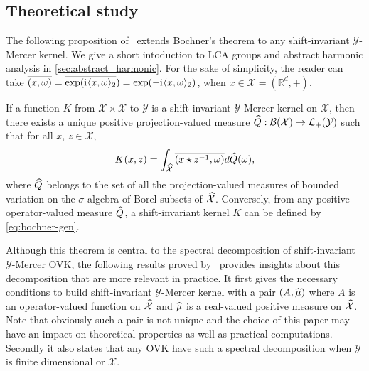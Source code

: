 \documentclass[twoside,11pt]{article}
\begin{document}
\subsection{Theoretical study}
\label{sec:theoretical_study}
The following proposition of~\citet{Zhang2012, neeb1998operator} extends
Bochner's theorem to any shift-invariant $\mathcal{Y}$-Mercer kernel. We give a
short intoduction to \acs{LCA} groups and abstract harmonic analysis in
\cref{sec:abstract_harmonic}. For the sake of simplicity, the reader can take
$\overline{(x,\omega)}=\overline{\exp({\mathrm{i}\mkern1mu}\langle x,
\omega\rangle_2})=\exp(-{\mathrm{i}\mkern1mu}\langle x,\omega\rangle_2)$, when $x\in\mathcal{X}=(\mathbb{R}^d,
+)$.
\begin{proposition}
    \label{pr:operator_valued_bochner}
    If a function $K$ from $\mathcal{X} \times \mathcal{X}$ to $\mathcal{Y}$ is
    a shift-invariant $\mathcal{Y}$-Mercer kernel on $\mathcal{X}$, then there
    exists a unique positive projection-valued measure $\widehat{Q}:
    \mathcal{B}(\mathcal{X}) \to
    \mathcal{L}_+(\mathcal{Y})$ such that for all $x$, $z \in \mathcal{X}$,
    \begin{dmath}
        \label{eq:bochner-gen}
        K(x, z) = \int_{\dual{\mathcal{X}}} \conj{\pairing{x \groupop \inv{z},
        \omega}} d\dual{Q}(\omega),
    \end{dmath}
    where $\widehat{Q}$ belongs to the set of all the projection-valued measures
    of bounded variation on the $\sigma$-algebra of Borel subsets of
    $\widehat{\mathcal{X}}$. Conversely, from any positive operator-valued measure
    $\widehat{Q}$, a shift-invariant kernel $K$ can be defined by
    \cref{eq:bochner-gen}.
\end{proposition}
Although this theorem is central to the spectral decomposition of
shift-invariant $\mathcal{Y}$-Mercer \acs{OVK}, the following results proved
by~\citet{Carmeli2010} provides insights about this decomposition that are more
relevant in practice. It first gives the necessary conditions to build
shift-invariant $\mathcal{Y}$-Mercer kernel with a pair $(A, \widehat{\mu})$ where
$A$ is an operator-valued function on $\widehat{\mathcal{X}}$ and $\widehat{\mu}$ is
a real-valued positive measure on $\widehat{\mathcal{X}}$. Note that obviously
such a pair is not unique and the choice of this paper may have an impact on
theoretical properties as well as practical computations.  Secondly it also
states that any \acs{OVK} have such a spectral decomposition when $\mathcal{Y}$
is finite dimensional or $\mathcal{X}$.
\end{document}
